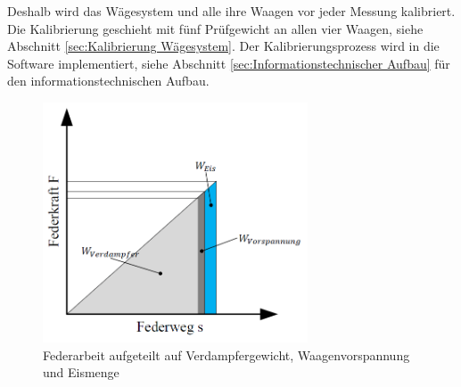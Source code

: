 Deshalb wird das Wägesystem und alle ihre Waagen vor jeder Messung kalibriert. Die Kalibrierung geschieht mit fünf Prüfgewicht an allen vier Waagen, siehe Abschnitt \ref{sec:Kalibrierung Wägesystem}. Der Kalibrierungsprozess wird in die Software implementiert, siehe Abschnitt \ref{sec:Informationstechnischer Aufbau} für den informationstechnischen Aufbau. 



\begin{figure}
\centering		
\includegraphics[width=0.7\textwidth]{Pictures/Federarbeit.png}
\caption{Federarbeit aufgeteilt auf Verdampfergewicht, Waagenvorspannung und Eismenge}
\label{fig:Feder}
\end{figure}

